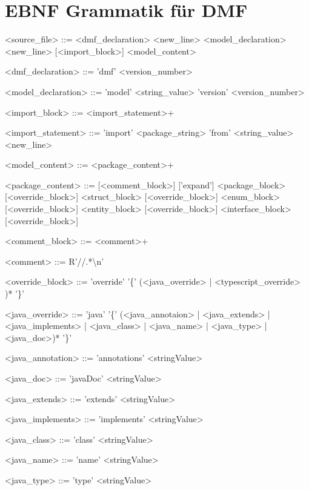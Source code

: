 \documentclass[./einleitung.tex]{subfiles}
\begin{document}
\section{EBNF Grammatik für DMF}
\setlength{\grammarparsep}{20pt plus 1pt minus 1pt} %
\setlength{\grammarindent}{12em} %

\begin{grammar}
<source_file> ::= <dmf_declaration> <new_line> <model_declaration> <new_line> [<import_block>] <model_content>

<dmf_declaration> ::= 'dmf' <version_number>


<model_declaration> ::= 'model' <string_value> 'version' <version_number>

<import_block> ::= <import_statement>+

<import_statement> ::= 'import' <package_string> 'from' <string_value> <new_line>


<model_content> ::= <package_content>+

<package_content> ::= [<comment_block>] ['expand'] <package_block> [<override_block>]
 <struct_block> [<override_block>]
 <enum_block> [<override_block>]
 <entity_block> [<override_block>]
 <interface_block> [<override_block>]

<comment_block> ::= <comment>+

<comment> ::= R'//.*\textbackslash n'

<override_block> ::= 'override' '\{' (<java_override> | <typescript_override> )* '\}'

<java_override> ::= 'java' '\{' (<java_annotaion> | <java_extends> | <java_implements> | <java_class> | <java_name> | <java_type> | <java_doc>)* '\}'

<java_annotation> ::= 'annotations' <stringValue>

<java_doc> ::= 'javaDoc' <stringValue>

<java_extends> ::= 'extends' <stringValue>

<java_implements> ::= 'implements' <stringValue>

<java_class> ::= 'class' <stringValue>

<java_name> ::= 'name' <stringValue>

<java_type> ::= 'type' <stringValue>



\end{grammar}
\end{document}
